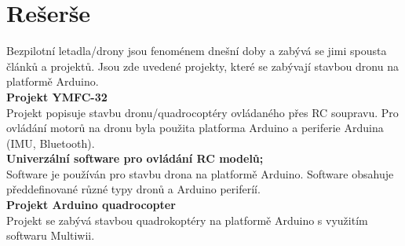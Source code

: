 \chapter{Rešerše}
\label{2-teorie}

Bezpilotní letadla/drony jsou fenoménem dnešní doby a zabývá se jimi spousta článků a projektů. Jsou zde uvedené projekty, které se zabývají stavbou dronu na platformě Arduino.\\

\textbf{Projekt YMFC-32}\\
Projekt popisuje stavbu dronu/quadrocoptéry ovládaného přes RC soupravu. Pro ovládání motorů na dronu byla použita platforma Arduino a periferie Arduina (IMU, Bluetooth). \cite{ymfc}\\

\textbf{Univerzální software pro ovládání RC modelů;}\\
Software je používán pro stavbu drona na platformě Arduino. Software obsahuje předdefinované různé typy dronů a Arduino periferíí. \cite{multiwii}\\

\textbf{Projekt Arduino quadrocopter}\\
Projekt se zabývá stavbou quadrokoptéry na platformě Arduino s využitím softwaru  Multiwii. \cite{mydronelab}\\


